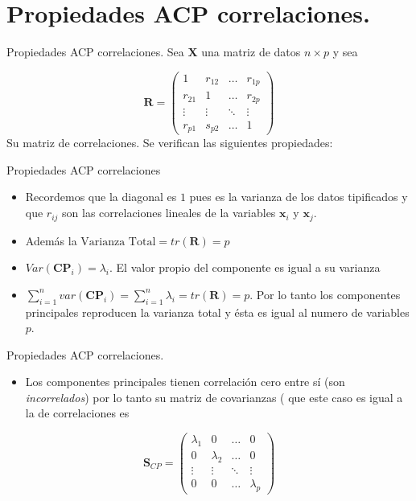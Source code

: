\documentclass[
  ignorenonframetext,
]{beamer}
\providecommand{\tightlist}{%
  \setlength{\itemsep}{0pt}\setlength{\parskip}{0pt}}
\begin{document}
\hypertarget{propiedades-acp-correlaciones.}{%
\section{Propiedades ACP
correlaciones.}\label{propiedades-acp-correlaciones.}}

\begin{frame}{Propiedades ACP correlaciones.}
\protect\hypertarget{propiedades-acp-correlaciones.-1}{}
Sea \(\mathbf{X}\) una matriz de datos \(n\times p\) y sea

\[\mathbf{R}=\left(\begin{array}{cccc}
1& r_{ 1 2}&\ldots &r_{1 p}\\
r_{2 1}& 1&\ldots &r_{2 p}\\
\vdots & \vdots & \ddots& \vdots\\
r_{p 1}& s_{ p 2}&\ldots &1
\end{array}
\right)\] Su matriz de correlaciones. Se verifican las siguientes
propiedades:
\end{frame}

\begin{frame}{Propiedades ACP correlaciones}
\protect\hypertarget{propiedades-acp-correlaciones}{}
\begin{itemize}
\item
  Recordemos que la diagonal es \(1\) pues es la varianza de los datos
  tipificados y que \(r_{i j}\) son las correlaciones lineales de la
  variables \(\mathbf{x}_i\) y \(\mathbf{x}_j\).
\item
  Además la \(\mbox{Varianza Total}= tr(\mathbf{R})=p\)
\item
  \(Var(\mathbf{CP}_i)= \lambda_i\). El valor propio del componente es
  igual a su varianza
\item
  \(\sum_{i=1}^n var(\mathbf{CP}_i)=\sum_{i=1}^n \lambda_i=tr(\mathbf{R})=p\).
  Por lo tanto los componentes principales reproducen la varianza total
  y ésta es igual al numero de variables \(p\).
\end{itemize}
\end{frame}

\begin{frame}{Propiedades ACP correlaciones.}
\protect\hypertarget{propiedades-acp-correlaciones.-2}{}
\begin{itemize}
\tightlist
\item
  Los componentes principales tienen correlación cero entre sí (son
  \emph{incorrelados}) por lo tanto su matriz de covarianzas ( que este
  caso es igual a la de correlaciones es
\end{itemize}

\[\mathbf{S}_{CP}=\left(\begin{array}{cccc}
\lambda_1& 0 &\ldots &0\\
0& \lambda_{2}&\ldots & 0\\
\vdots & \vdots &\ddots & \vdots\\
0 & 0&\ldots &\lambda_{p}
\end{array}
\right)\]
\end{frame}
\end{document}
